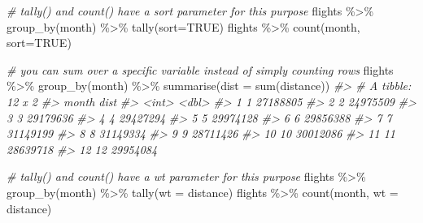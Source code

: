 \documentclass[
]{book}
\newenvironment{Shaded}{\begin{snugshade}}{\end{snugshade}}
\newcommand{\AttributeTok}[1]{\textcolor[rgb]{0.77,0.63,0.00}{#1}}
\newcommand{\CommentTok}[1]{\textcolor[rgb]{0.56,0.35,0.01}{\textit{#1}}}
\newcommand{\ConstantTok}[1]{\textcolor[rgb]{0.00,0.00,0.00}{#1}}
\newcommand{\FunctionTok}[1]{\textcolor[rgb]{0.00,0.00,0.00}{#1}}
\newcommand{\NormalTok}[1]{#1}
\newcommand{\SpecialCharTok}[1]{\textcolor[rgb]{0.00,0.00,0.00}{#1}}
\begin{document}
\begin{Shaded}
\begin{Highlighting}[]
\CommentTok{\# tally() and count() have a sort parameter for this purpose}
\NormalTok{flights }\SpecialCharTok{\%\textgreater{}\%} \FunctionTok{group\_by}\NormalTok{(month) }\SpecialCharTok{\%\textgreater{}\%} \FunctionTok{tally}\NormalTok{(}\AttributeTok{sort=}\ConstantTok{TRUE}\NormalTok{)}
\NormalTok{flights }\SpecialCharTok{\%\textgreater{}\%} \FunctionTok{count}\NormalTok{(month, }\AttributeTok{sort=}\ConstantTok{TRUE}\NormalTok{)}
\end{Highlighting}
\end{Shaded}

\begin{Shaded}
\begin{Highlighting}[]
\CommentTok{\# you can sum over a specific variable instead of simply counting rows}
\NormalTok{flights }\SpecialCharTok{\%\textgreater{}\%} \FunctionTok{group\_by}\NormalTok{(month) }\SpecialCharTok{\%\textgreater{}\%} \FunctionTok{summarise}\NormalTok{(}\AttributeTok{dist =} \FunctionTok{sum}\NormalTok{(distance))}
\CommentTok{\#\textgreater{} \# A tibble: 12 x 2}
\CommentTok{\#\textgreater{}    month     dist}
\CommentTok{\#\textgreater{}    \textless{}int\textgreater{}    \textless{}dbl\textgreater{}}
\CommentTok{\#\textgreater{}  1     1 27188805}
\CommentTok{\#\textgreater{}  2     2 24975509}
\CommentTok{\#\textgreater{}  3     3 29179636}
\CommentTok{\#\textgreater{}  4     4 29427294}
\CommentTok{\#\textgreater{}  5     5 29974128}
\CommentTok{\#\textgreater{}  6     6 29856388}
\CommentTok{\#\textgreater{}  7     7 31149199}
\CommentTok{\#\textgreater{}  8     8 31149334}
\CommentTok{\#\textgreater{}  9     9 28711426}
\CommentTok{\#\textgreater{} 10    10 30012086}
\CommentTok{\#\textgreater{} 11    11 28639718}
\CommentTok{\#\textgreater{} 12    12 29954084}
\end{Highlighting}
\end{Shaded}

\begin{Shaded}
\begin{Highlighting}[]
\CommentTok{\# tally() and count() have a wt parameter for this purpose}
\NormalTok{flights }\SpecialCharTok{\%\textgreater{}\%} \FunctionTok{group\_by}\NormalTok{(month) }\SpecialCharTok{\%\textgreater{}\%} \FunctionTok{tally}\NormalTok{(}\AttributeTok{wt =}\NormalTok{ distance)}
\NormalTok{flights }\SpecialCharTok{\%\textgreater{}\%} \FunctionTok{count}\NormalTok{(month, }\AttributeTok{wt =}\NormalTok{ distance)}
\end{Highlighting}
\end{Shaded}
\end{document}
